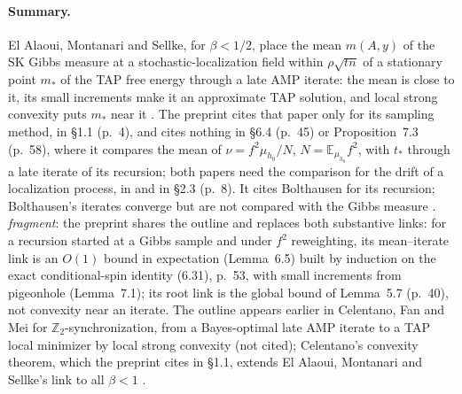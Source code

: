 \documentclass[11pt]{article}
\newcommand{\E}{\mathbb{E}}
\newcommand{\ploc}[2]{#1}
\newcommand{\sloc}[2]{\cite[#2]{#1}}
\newcommand{\rel}[1]{\textit{#1}}
\begin{document}
\paragraph{Summary.}
El Alaoui, Montanari and Sellke, for $\beta<1/2$, place the mean $m(A,y)$ of
the SK Gibbs measure at a stochastic-localization field within
$\rho\sqrt{tn}$ of a stationary point $m_*$ of the TAP free energy through a
late AMP iterate: the mean is close to it, its small increments make it an
approximate TAP solution, and local strong convexity puts $m_*$ near it
\sloc{ElAlaouiMontanariSellke2022-SamplingSKAlgorithmicSL}{Lemma~4.10(2), p.~20; proof, p.~40}.
The preprint cites that paper only for its sampling method, in
\ploc{\S1.1 (p.~4)}{introduction.tex:118--120}, and cites nothing in \ploc{\S6.4 (p.~45)}{residuals.tex:288--314} or
\ploc{Proposition~7.3 (p.~58)}{consequences.tex:198--243}, where it compares
the mean of $\nu=f^2\mu_{h_0}/N$, $N=\E_{\mu_{h_0}}f^2$, with $t_*$ through a
late iterate of its recursion; both papers need the comparison for the drift
of a localization process, in
\sloc{ElAlaouiMontanariSellke2022-SamplingSKAlgorithmicSL}{Lemma~4.14, p.~23}
and in \ploc{\S2.3 (p.~8)}{observation.tex:118--123}. It
cites Bolthausen for its recursion; Bolthausen's iterates converge
\sloc{Bolthausen2012-IterativeTAPConstruction}{Thm~2.1, p.~4} but are not
compared with the Gibbs measure
\sloc{Bolthausen2012-IterativeTAPConstruction}{p.~2}.
\rel{fragment}: the preprint shares the outline and replaces both substantive
links: for a recursion started at a Gibbs sample and under $f^2$
reweighting, its mean--iterate link is an $O(1)$ bound in expectation
\ploc{(Lemma~6.5)}{residuals.tex:886--906} built by induction on the exact
conditional-spin identity \ploc{(6.31), p.~53}{residuals.tex:919--923}, with
small increments from pigeonhole \ploc{(Lemma~7.1)}{consequences.tex:18--83};
its root link is the global bound of
\ploc{Lemma~5.7 (p.~40)}{stability.tex:1105--1125}, not convexity near an
iterate.
The outline appears earlier in Celentano, Fan and Mei for
$\mathbb Z_2$-synchronization, from a Bayes-optimal late AMP iterate to a TAP
local minimizer by local strong convexity
\sloc{CelentanoFanMei2021-LocalConvexityTAPZ2Sync}{Thm~2.1(a), p.~8; p.~18}
(not cited); Celentano's convexity theorem, which the preprint cites in
\ploc{\S1.1}{introduction.tex:119--121}, extends El Alaoui,
Montanari and Sellke's link to all $\beta<1$
\sloc{Celentano2022-SudakovFerniquePostAMPTAPConvexity}{Thm~2, pp.~10--11; p.~4}.
\end{document}
